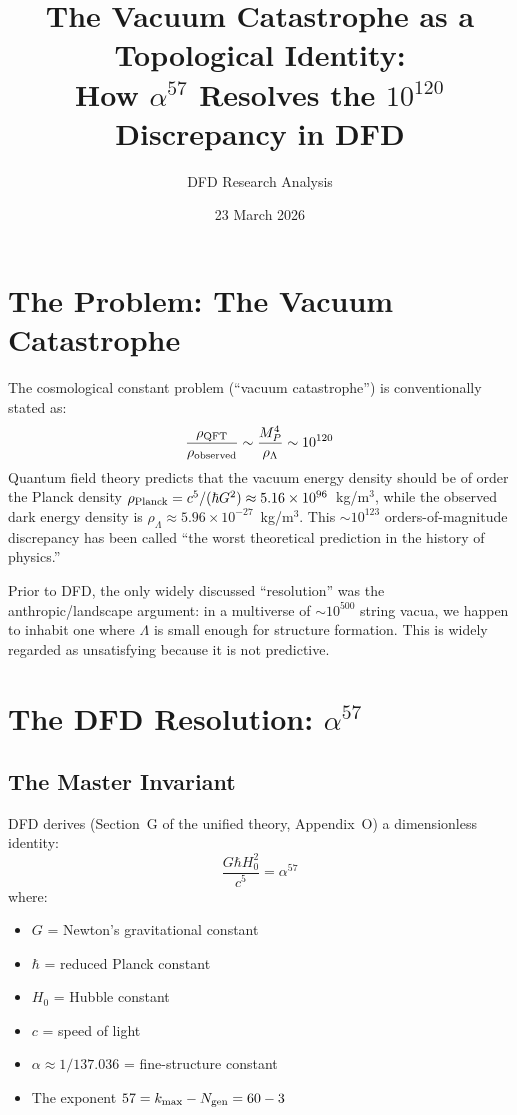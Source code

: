 \documentclass[11pt]{article}
\title{The Vacuum Catastrophe as a Topological Identity:\\
  How $\alpha^{57}$ Resolves the $10^{120}$ Discrepancy in DFD}
\author{DFD Research Analysis}
\date{23 March 2026}
\begin{document}
\maketitle

\section{The Problem: The Vacuum Catastrophe}

The cosmological constant problem (``vacuum catastrophe'') is conventionally stated as:
\begin{equation}
\frac{\rho_{\rm QFT}}{\rho_{\rm observed}} \sim \frac{M_P^4}{\rho_\Lambda} \sim 10^{120}
\end{equation}
Quantum field theory predicts that the vacuum energy density should be of order the
Planck density $\rho_{\rm Planck} = c^5/(\hbar G^2) \approx 5.16 \times 10^{96}$~kg/m$^3$,
while the observed dark energy density is $\rho_\Lambda \approx 5.96 \times 10^{-27}$~kg/m$^3$.
This $\sim 10^{123}$ orders-of-magnitude discrepancy has been called ``the worst theoretical
prediction in the history of physics.''

Prior to DFD, the only widely discussed ``resolution'' was the anthropic/landscape
argument: in a multiverse of $\sim 10^{500}$ string vacua, we happen to inhabit one where
$\Lambda$ is small enough for structure formation. This is widely regarded as unsatisfying
because it is not predictive.

\section{The DFD Resolution: $\alpha^{57}$}

\subsection{The Master Invariant}

DFD derives (Section~G of the unified theory, Appendix~O) a dimensionless identity:
\begin{equation}
\boxed{\frac{G\hbar H_0^2}{c^5} = \alpha^{57}}
\label{eq:invariant}
\end{equation}
where:
\begin{itemize}
\item $G$ = Newton's gravitational constant
\item $\hbar$ = reduced Planck constant
\item $H_0$ = Hubble constant
\item $c$ = speed of light
\item $\alpha \approx 1/137.036$ = fine-structure constant
\item The exponent $57 = k_{\max} - N_{\rm gen} = 60 - 3$
\end{itemize}
\end{document}
